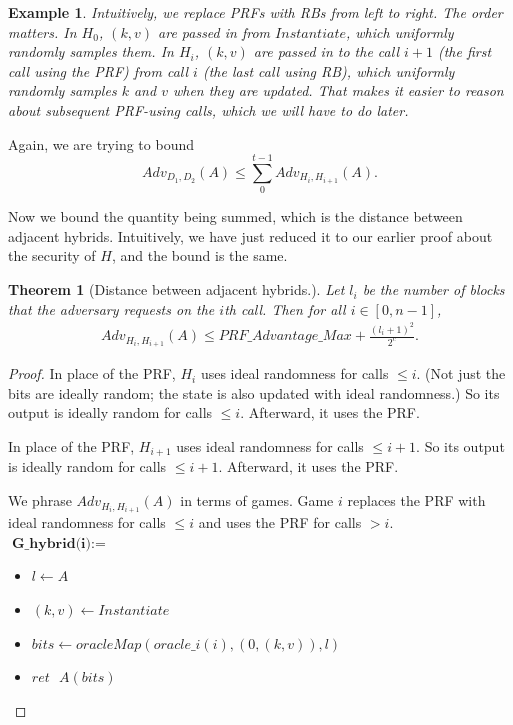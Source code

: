 \documentclass[12pt,lot, lof]{puthesis}
\newenvironment{game}
{ \begin{itemize}[noitemsep,nolistsep] 
}
{ \end{itemize}                  }
\newcommand{\s} {\textrm{ }}
\newcommand{\f}{\frac}
\newcommand{\lar}{\leftarrow}
\newtheorem{thm}{Theorem}
\newtheorem{ex}{Example}[thm]
\begin{document}
{\begin{ex}
Intuitively, we replace PRFs with RBs from left to right. The order matters. In $H_0$, $(k,v)$ are passed in from $Instantiate$, which uniformly randomly samples them. In $H_i$, $(k,v)$ are passed in to the call $i+1$ (the first call using the PRF) from call $i$ (the last call using RB), which uniformly randomly samples $k$ and $v$ when they are updated. That makes it easier to reason about subsequent PRF-using calls, which we will have to do later.
\end{ex}

Again, we are trying to bound
$$Adv_{D_1, D_2}(A) \leq \sum_{0}^{t-1} Adv_{H_i, H_{i+1}}(A).$$

Now we bound the quantity being summed, which is the distance between adjacent hybrids. Intuitively, we have just reduced it to our earlier proof about the security of $H$, and the bound is the same.

\begin{thm}[Distance between adjacent hybrids.] \label{thm:adjacent_hybrids}
Let $l_i$ be the number of blocks that the adversary requests on the $i$th call. Then for all $i \in [0,n-1]$,
\begin{gather*}
Adv_{H_i, H_{i+1}}(A) \leq PRF\_Advantage\_Max + \f{(l_i+1)^2}{2^c}.
\end{gather*} \end{thm}
\begin{proof} 

In place of the PRF, $H_i$ uses ideal randomness for calls $\leq i$. (Not just the bits are ideally random; the state is also updated with ideal randomness.) So its output is ideally random for calls $\leq i$. Afterward, it uses the PRF.

In place of the PRF, $H_{i+1}$ uses ideal randomness for calls $\leq i + 1$. So its output is ideally random for calls $\leq i+1$. Afterward, it uses the PRF.

We phrase $Adv_{H_i, H_{i+1}}(A)$ in terms of games. Game $i$ replaces the PRF with ideal randomness for calls $\leq i$ and uses the PRF for calls $> i$.\\

$\textbf{G\_hybrid(i)} := $
\begin{game}
\item[] $l \leftarrow A$
\item[] $(k,v) \leftarrow Instantiate$
\item[] $bits \lar oracleMap(oracle\_i(i),(0, (k, v)),l)$
\item[] $ret \s A(bits)$ \\
\end{game}


\end{proof}}
\end{document}
